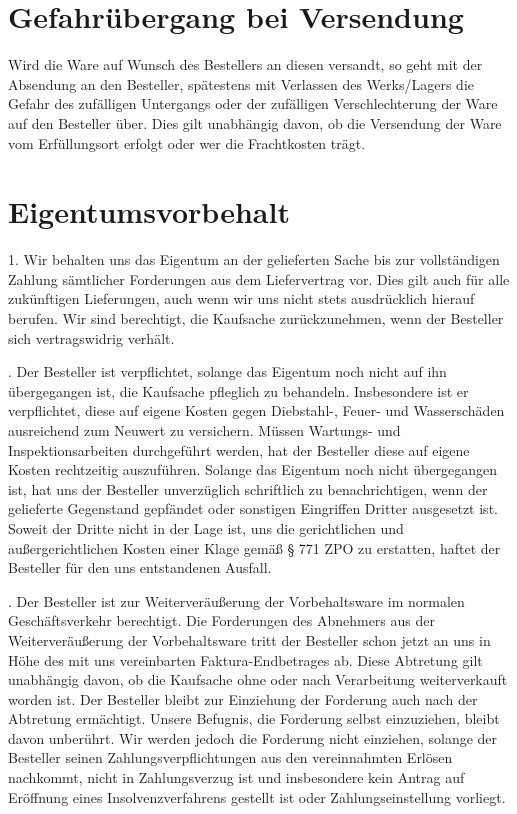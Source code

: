 \documentclass[a4paper, final, 12pt, oneside]{scrartcl}
\numberwithin{equation}{section}
\numberwithin{table}{section}
\numberwithin{figure}{section}
\begin{document}
\begin{multicols}{2}
\section{Gefahrübergang bei Versendung}
Wird die Ware auf Wunsch des Bestellers an diesen versandt, so geht mit
der Absendung an den Besteller, spätestens mit Verlassen des Werks/Lagers
die Gefahr des zufälligen Untergangs oder der zufälligen Verschlechterung
der Ware auf den Besteller über. Dies gilt unabhängig davon, ob die Versendung
der Ware vom Erfüllungsort erfolgt oder wer die Frachtkosten trägt.

\section{Eigentumsvorbehalt}
1. Wir behalten uns das Eigentum an der gelieferten Sache bis zur
vollständigen Zahlung sämtlicher Forderungen aus dem Liefervertrag
vor. Dies gilt auch für alle zukünftigen Lieferungen, auch wenn wir
uns nicht stets ausdrücklich hierauf berufen. Wir sind berechtigt,
die Kaufsache zurückzunehmen, wenn der Besteller sich vertragswidrig verhält.

. Der Besteller ist verpflichtet, solange das Eigentum noch nicht auf
ihn übergegangen ist, die Kaufsache pfleglich zu behandeln. Insbesondere
ist er verpflichtet, diese auf eigene Kosten gegen Diebstahl-, Feuer- und
Wasserschäden ausreichend zum Neuwert zu versichern. Müssen Wartungs- und
Inspektionsarbeiten durchgeführt werden, hat der Besteller diese auf
eigene Kosten rechtzeitig auszuführen. Solange das Eigentum noch nicht
übergegangen ist, hat uns der Besteller unverzüglich schriftlich zu
benachrichtigen, wenn der gelieferte Gegenstand gepfändet oder sonstigen
Eingriffen Dritter ausgesetzt ist. Soweit der Dritte nicht in der Lage ist,
uns die gerichtlichen und außergerichtlichen Kosten einer Klage gemäß
§ 771 ZPO zu erstatten, haftet der Besteller für den uns entstandenen Ausfall.

. Der Besteller ist zur Weiterveräußerung der Vorbehaltsware im normalen
Geschäftsverkehr berechtigt. Die Forderungen des Abnehmers aus der
Weiterveräußerung der Vorbehaltsware tritt der Besteller schon jetzt an
uns in Höhe des mit uns vereinbarten Faktura-Endbetrages ab. Diese Abtretung
gilt unabhängig davon, ob die Kaufsache ohne oder nach Verarbeitung
weiterverkauft worden ist. Der Besteller bleibt zur Einziehung der Forderung
auch nach der Abtretung ermächtigt. Unsere Befugnis, die Forderung selbst
einzuziehen, bleibt davon unberührt. Wir werden jedoch die Forderung nicht
einziehen, solange der Besteller seinen Zahlungsverpflichtungen aus den
vereinnahmten Erlösen nachkommt, nicht in Zahlungsverzug ist und insbesondere
kein Antrag auf Eröffnung eines Insolvenzverfahrens gestellt ist oder
Zahlungseinstellung vorliegt.


\end{multicols}
\end{document}
